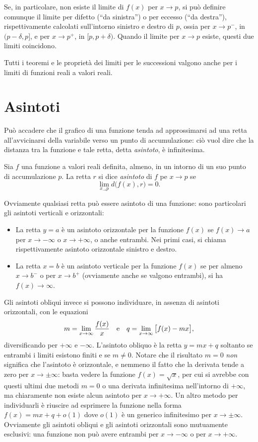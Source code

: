 Se, in particolare, non esiste il limite di $f(x)$ per $x\to p$, si può definire comunque il limite per difetto (``da sinistra'') o per eccesso (``da destra''), rispettivamente calcolati sull'intorno sinistro e destro di $p$, ossia per $x\to p^-$, in $(p-\delta,p]$, e per $x\to p^+$, in $[p,p+\delta)$. Quando il limite per $x\to p$ esiste, questi due limiti coincidono.

Tutti i teoremi e le proprietà dei limiti per le successioni valgono anche per i limiti di funzioni reali a valori reali.

\section{Asintoti}
Può accadere che il grafico di una funzione tenda ad approssimarsi ad una retta all'avvicinarsi della variabile verso un punto di accumulazione: ciò vuol dire che la distanza tra la funzione e tale retta, detta \emph{asintoto}, è infinitesima.
\begin{definizione} \label{d:asintoto}
Sia $f$ una funzione a valori reali definita, almeno, in un intorno di un suo punto di accumulazione $p$. La retta $r$ si dice \emph{asintoto} di $f$ pe $x\to p$ se
\[
\lim_{x_\to p}d\big(f(x),r\big)=0.
\]
\end{definizione}
Ovviamente qualsiasi retta può essere asintoto di una funzione: sono particolari gli asintoti verticali e orizzontali:
\begin{itemize}
\item La retta $y=a$ è un asintoto orizzontale per la funzione $f(x)$ se $f(x)\to a$ per $x\to-\infty$ o $x\to+\infty$, o anche entrambi. Nei primi casi, si chiama rispettivamente asintoto orizzontale sinistro e destro.
\item La retta $x=b$ è un asintoto verticale per la funzione $f(x)$ se per almeno $x\to b^-$ o per $x\to b^+$ (ovviamente anche se valgono entrambi), si ha $f(x)\to\infty$.
\end{itemize}
Gli asintoti obliqui invece si possono individuare, in assenza di asintoti orizzontali, con le equazioni
\[
m=\lim_{x\to\infty}\frac{f(x)}{x}\quad\text{e}\quad q=\lim_{x\to\infty}\big[f(x)-mx\big],
\]
diversificando per $+\infty$ e $-\infty$. L'asintoto obliquo è la retta $y=mx+q$ soltanto se entrambi i limiti esistono finiti e se $m\neq 0$. Notare che il risultato $m=0$ \emph{non} significa che l'asintoto è orizzontale, e nemmeno il fatto che la derivata tende a zero per $x\to\pm\infty$: basta vedere la funzione $f(x)=\sqrt{x}$, per cui si avrebbe con questi ultimi due metodi $m=0$ o una derivata infinitesima nell'intorno di $+\infty$, ma chiaramente non esiste alcun asintoto per $x\to+\infty$.
Un altro metodo per individuarli è riuscire ad esprimere la funzione nella forma $f(x)=mx+q+o(1)$ dove $o(1)$ è un generico infinitesimo per $x\to\pm\infty$.
Ovviamente gli asintoti obliqui e gli asintoti orizzontali sono mutuamente esclusivi: una funzione non può avere entrambi per $x\to-\infty$ o per $x\to+\infty$.

